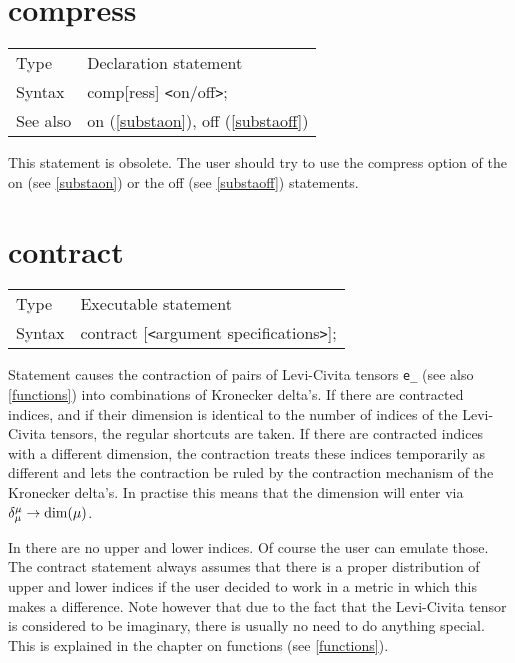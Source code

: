 
\section{compress}
\label{substacompress}

\noindent \begin{tabular}{ll}
Type & Declaration statement\\
Syntax & comp[ress] {\tt<}on/off{\tt>};
\\ See also & on (\ref{substaon}), off (\ref{substaoff})
\end{tabular} \vspace{4mm}

\noindent This statement is obsolete. The user should try 
to use the compress option of the on (see \ref{substaon}) or the off (see 
\ref{substaoff}) statements. \vspace{10mm}


\section{contract}
\label{substacontract}

\noindent \begin{tabular}{ll}
Type & Executable statement\\
Syntax & contract [{\tt<}argument specifications{\tt>}];
\end{tabular} \vspace{4mm}

\noindent Statement causes the contraction of pairs of 
Levi-Civita tensors \verb:e_: 
(see also \ref{functions}) into combinations of Kronecker 
delta's. If there are contracted indices, and if 
their dimension is identical to the number of indices of the Levi-Civita 
tensors, the regular shortcuts are taken. If there are contracted indices 
with a different dimension, the contraction treats these indices 
temporarily as different and lets the contraction be ruled by the 
contraction mechanism of the Kronecker delta's. In practise this means that 
the dimension will enter via $\delta^{\mu}_{\mu} \rightarrow {\rm 
dim}(\mu)$. \vspace{4mm}

\noindent In {\FORM} there are no upper and lower 
indices. Of course the user can 
emulate those. The contract statement always assumes that there is a proper 
distribution of upper and lower indices if the user decided to work in a 
metric in which this makes a difference. Note however that due to the fact 
that the Levi-Civita tensor is considered to be imaginary, there is usually 
no need to do anything special. This is explained in the chapter on 
functions (see \ref{functions}). \vspace{4mm}

